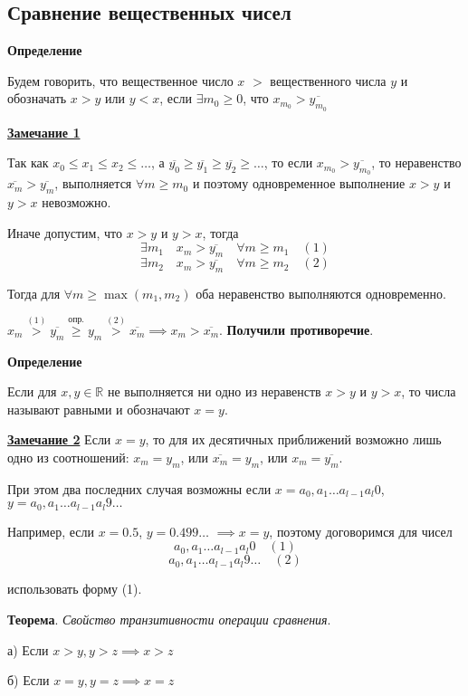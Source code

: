 \documentclass{article}
\begin{document}
\subsection{Сравнение вещественных чисел}
\textbf{Определение}

Будем говорить, что вещественное число $x$ $>$ вещественного числа $y$ и обозначать
$x > y$ или $y < x$, если $\exists m_0 \ge 0$, что $x_{m_0} > \overline{y_{m_0}}$

\underline{\textbf{Замечание 1}}

Так как $x_0 \le x_1 \le x_2 \le \dots$, 
а $\overline{y_0} \ge \overline{y_1} \ge \overline{y_2} \ge \dots$,
то если $x_{m_0} > \overline{y_{m_0}}$, то неравенство $\overline{x_m} > \overline{y_m}$,
выполняется $\forall m \ge m_0$ и поэтому одновременное выполнение
$x > y$ и $y > x$ невозможно.

Иначе допустим, что $x > y$ и $y > x$, тогда
\[\exists m_1 \quad x_m > \overline{y_m} \quad \forall m \ge m_1 \quad (1)\]
\[\exists m_2 \quad x_m > \overline{y_m} \quad \forall m \ge m_2 \quad (2)\]

Тогда для $\forall m \ge \max (m_1, m_2)$ оба неравенство выполняются одновременно.

$x_m \stackrel{(1)}{>} \overline{y_m}
\stackrel{\text{опр.}}{\ge} y_m 
\stackrel{(2)}{>} \overline{x_m} \implies x_m > \overline{x_m}$.
\textbf{Получили противоречие}.

\textbf{Определение}

Если для $x, y \in \mathbb{R}$ не выполняется ни одно из неравенств $x > y$ и $y > x$,
то числа называют равными и обозначают $x = y$.

\underline{\textbf{Замечание 2}}
Если $x = y$, то для их десятичных приближений возможно лишь одно из соотношений:
$x_m = y_m$, или $\overline{x_m} = y_m$, или $x_m = \overline{y_m}$.

При этом два последних случая возможны если $x = a_0,a_1 \dots a_{l-1}a_l0$,
$y = a_0,a_1 \dots a_{l-1}a_l9 \dots$ 

Например, если $x = 0.5$, $y = 0.499 \dots$ $\implies x = y$,
поэтому договоримся для чисел
\[a_0,a_1 \dots a_{l-1}a_l0 \quad (1)\]
\[a_0,a_1 \dots a_{l-1}a_l9 \dots \quad (2)\]

использовать форму (1).

\textbf{Теорема}. \textit{Свойство транзитивности операции сравнения}.

а) Если $x > y, y > z \implies x > z$

б) Если $x = y, y = z \implies x = z$
\end{document}
